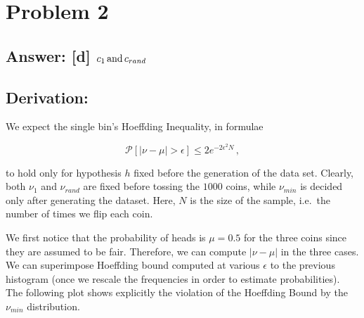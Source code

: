 \documentclass[11pt]{article}
\begin{document}
    \hypertarget{problem-2}{%
\section{Problem 2}\label{problem-2}}

\hypertarget{answer-d-c_1-rm-and-c_rand}{%
\subsection{\texorpdfstring{Answer: {[}d{]}
\(c_1 \, {\rm and}\, c_{rand}\)}{Answer: {[}d{]} c\_1 \textbackslash{}, \{\textbackslash{}rm and\}\textbackslash{}, c\_\{rand\}}}\label{answer-d-c_1-rm-and-c_rand}}

\hypertarget{derivation}{%
\subsection{Derivation:}\label{derivation}}

We expect the single bin's Hoeffding Inequality, in formulae

\[
\mathcal{P}[|\nu-\mu|>\epsilon]\le 2 e^{-2\epsilon^2 N}\,,
\]

to hold only for hypothesis \(h\) fixed before the generation of the
data set. Clearly, both \(\nu_{1}\) and \(\nu_{rand}\) are fixed before
tossing the \(1000\) coins, while \(\nu_{min}\) is decided only after
generating the dataset. Here, \(N\) is the size of the sample, i.e.~the
number of times we flip each coin.

We first notice that the probability of heads is \(\mu=0.5\) for the
three coins since they are assumed to be fair. Therefore, we can compute
\(|\nu-\mu|\) in the three cases. We can superimpose Hoeffding bound
computed at various \(\epsilon\) to the previous histogram (once we
rescale the frequencies in order to estimate probabilities). The
following plot shows explicitly the violation of the Hoeffding Bound by
the \(\nu_{min}\) distribution.
\end{document}
